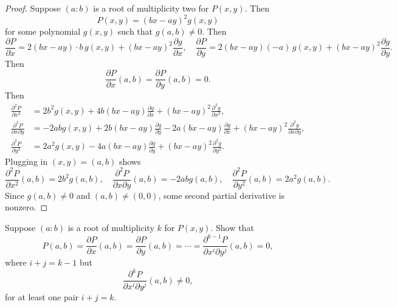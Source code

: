 \begin{proof}
    Suppose $(a:b)$ is a root of multiplicity two for $P(x,y)$.  
    Then
    \[
    P(x,y) = (bx - ay)^2 g(x,y)
    \]
    for some polynomial $g(x,y)$ such that $g(a,b) \ne 0$.
    Then
    \[
    \frac{\partial P}{\partial x} = 2(bx - ay) \cdot b \, g(x,y) + (bx - ay)^2 \frac{\partial g}{\partial x}, \quad
    \frac{\partial P}{\partial y} = 2(bx - ay)(-a) \, g(x,y) + (bx - ay)^2 \frac{\partial g}{\partial y}.
    \]
    Then
    \[
    \frac{\partial P}{\partial x}(a,b) = \frac{\partial P}{\partial y}(a,b) = 0.
    \]
    Then
    \begin{align*}
    \frac{\partial^2 P}{\partial x^2} &= 2 b^2 g(x,y) + 4 b (bx - ay) \frac{\partial g}{\partial x} + (bx - ay)^2 \frac{\partial^2 g}{\partial x^2}, \\
    \frac{\partial^2 P}{\partial x \partial y} &= -2 ab g(x,y) + 2 b (bx - ay) \frac{\partial g}{\partial y} - 2 a (bx - ay) \frac{\partial g}{\partial x} + (bx - ay)^2 \frac{\partial^2 g}{\partial x \partial y}, \\
    \frac{\partial^2 P}{\partial y^2} &= 2 a^2 g(x,y) - 4 a (bx - ay) \frac{\partial g}{\partial y} + (bx - ay)^2 \frac{\partial^2 g}{\partial y^2}.
    \end{align*}
    Plugging in $(x,y) = (a, b)$ shows
    \[
    \frac{\partial^2 P}{\partial x^2}(a,b) = 2 b^2 g(a,b), \quad
    \frac{\partial^2 P}{\partial x \partial y}(a,b) = -2 ab g(a,b), \quad
    \frac{\partial^2 P}{\partial y^2}(a,b) = 2 a^2 g(a,b).
    \]
    Since $g(a,b) \ne 0$ and $(a,b) \ne (0,0)$, some second partial derivative is nonzero.
\end{proof}


\begin{tcolorbox}[title=Problem 8, breakable]
    Suppose $(a : b)$ is a root of multiplicity $k$ 
    for $P(x, y)$. Show that 
    \[P(a, b) = \frac{\partial P}{\partial x}(a, b) = \frac{\partial P}{\partial y}(a, b) = \cdots = \frac{\partial^{k - 1} P}{\partial x^i \partial y^j}(a, b) = 0,\]
    where $i + j = k - 1$ but 
    \[\frac{\partial^k P}{\partial x^i \partial y^j}(a, b) \ne 0,\]
    for at least one pair $i + j = k$.
\end{tcolorbox}

